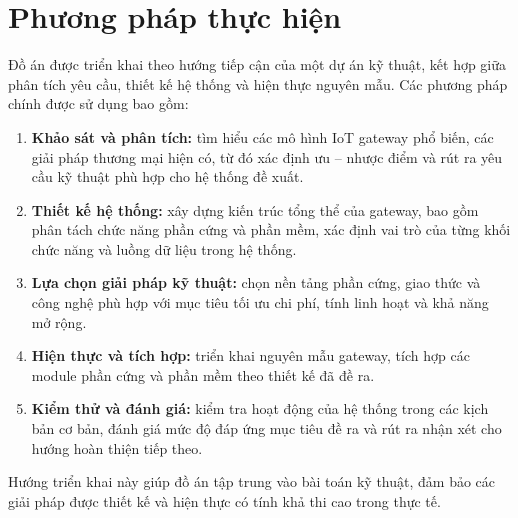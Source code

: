     \section{Phương pháp thực hiện}
        Đồ án được triển khai theo hướng tiếp cận của một dự án kỹ thuật, kết hợp giữa phân tích yêu cầu, thiết kế hệ thống và hiện thực nguyên mẫu. Các phương pháp chính được sử dụng bao gồm:
        \begin{enumerate}
            \item \textbf{Khảo sát và phân tích:} tìm hiểu các mô hình IoT gateway phổ biến, các giải pháp thương mại hiện có, từ đó xác định ưu – nhược điểm và rút ra yêu cầu kỹ thuật phù hợp cho hệ thống đề xuất.
            \item \textbf{Thiết kế hệ thống:} xây dựng kiến trúc tổng thể của gateway, bao gồm phân tách chức năng phần cứng và phần mềm, xác định vai trò của từng khối chức năng và luồng dữ liệu trong hệ thống.
            \item \textbf{Lựa chọn giải pháp kỹ thuật:} chọn nền tảng phần cứng, giao thức và công nghệ phù hợp với mục tiêu tối ưu chi phí, tính linh hoạt và khả năng mở rộng.
            \item \textbf{Hiện thực và tích hợp:} triển khai nguyên mẫu gateway, tích hợp các module phần cứng và phần mềm theo thiết kế đã đề ra.
            \item \textbf{Kiểm thử và đánh giá:} kiểm tra hoạt động của hệ thống trong các kịch bản cơ bản, đánh giá mức độ đáp ứng mục tiêu đề ra và rút ra nhận xét cho hướng hoàn thiện tiếp theo.
        \end{enumerate}
        Hướng triển khai này giúp đồ án tập trung vào bài toán kỹ thuật, đảm bảo các giải pháp được thiết kế và hiện thực có tính khả thi cao trong thực tế.